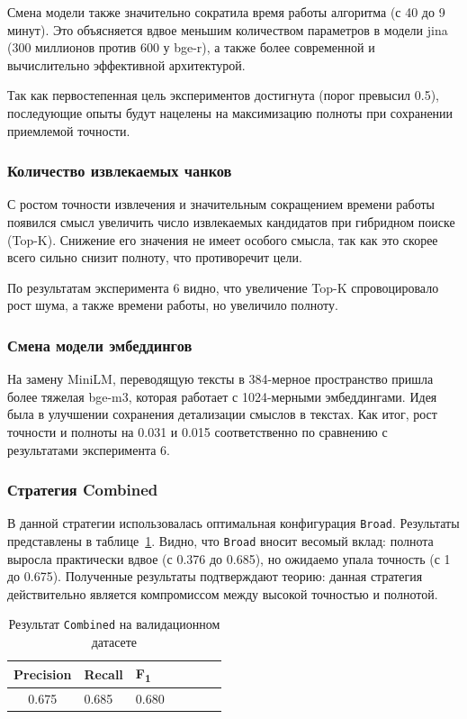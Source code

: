 Смена модели также значительно сократила время работы алгоритма
(с 40 до 9 минут). Это объясняется вдвое меньшим количеством параметров
в модели jina (300 миллионов против 600 у bge-r),
а также более современной и вычислительно эффективной архитектурой.

Так как первостепенная цель экспериментов достигнута (порог превысил 0.5),
последующие опыты будут нацелены на максимизацию полноты
при сохранении приемлемой точности.

\subsubsection*{Количество извлекаемых чанков}
С ростом точности извлечения и значительным сокращением
времени работы появился смысл увеличить число
извлекаемых кандидатов при гибридном поиске (Top-K).
Снижение его значения не имеет особого смысла,
так как это скорее всего сильно снизит полноту,
что противоречит цели.

По результатам эксперимента 6 видно,
что увеличение Top-K спровоцировало рост шума,
а также времени работы, но увеличило полноту.

\subsubsection*{Смена модели эмбеддингов}
На замену MiniLM, переводящую тексты в 384-мерное пространство
пришла более тяжелая bge-m3, которая работает с 1024-мерными эмбеддингами.
Идея была в улучшении сохранения детализации смыслов в текстах.
Как итог, рост точности и полноты на 0.031 и 0.015 соответственно
по сравнению с результатами эксперимента 6.

\subsubsection*{Стратегия Combined}

В данной стратегии использовалась оптимальная конфигурация \texttt{Broad}.
Результаты представлены в таблице~\ref{tab:combined_retrieval}.
Видно, что \texttt{Broad} вносит весомый вклад:
полнота выросла практически вдвое (с 0.376 до 0.685),
но ожидаемо упала точность (с 1 до 0.675).
Полученные результаты подтверждают
теорию: данная стратегия действительно является компромиссом
между высокой точностью и полнотой.

\begin{table}[H]
    \caption{Результат \texttt{Combined} на валидационном датасете}
    \label{tab:combined_retrieval}
    \centering
    \begin{tabular}{clllccc}
        \hline
        \textbf{Precision} & \textbf{Recall} & \textbf{F\textsubscript{1}} \\
        \hline
        0.675              & 0.685           & 0.680                       \\
        \hline
    \end{tabular}
\end{table}

